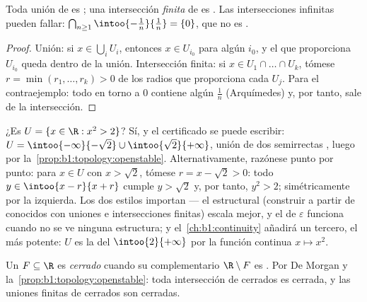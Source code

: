 \begin{proposition}\label{prop:b1:topology:openstable}
Toda unión de  es ; una intersección \emph{finita} de
 es . Las intersecciones infinitas pueden fallar:
$\bigcap_{n \geq 1} \intoo{-\frac 1n}{\frac 1n} = \{0\}$, que no es .
\end{proposition}

\begin{proof}
Unión: si $x \in \bigcup_i U_i$, entonces $x \in U_{i_0}$ para algún
$i_0$, y el  que proporciona $U_{i_0}$ queda dentro de la
unión. Intersección finita: si $x \in U_1 \cap \dots \cap U_k$, tómese
$r = \min(r_1, \dots, r_k) > 0$ de los radios que proporciona cada
$U_j$. Para el contraejemplo: todo  en torno a $0$ contiene
algún $\frac{1}{n}$ (Arquímedes) y, por tanto, sale de la intersección.
\end{proof}

\begin{example}\label{ex:b1:topology:radii}
¿Es  $U = \{x \in \R : x^2 > 2\}$? Sí, y el certificado se
puede escribir: $U = \intoo{-\infty}{-\sqrt2} \cup
\intoo{\sqrt2}{+\infty}$, unión de dos semirrectas , luego
 por la~\cref{prop:b1:topology:openstable}. Alternativamente,
razónese punto por punto: para $x \in U$ con $x > \sqrt 2$, tómese
$r = x - \sqrt2 > 0$: todo $y \in \intoo{x - r}{x + r}$ cumple
$y > \sqrt 2$ y, por tanto, $y^2 > 2$; simétricamente por la
izquierda. Los dos estilos importan --- el estructural (construir a
partir de  conocidos con uniones e intersecciones finitas)
escala mejor, y el de $\varepsilon$ funciona cuando no se ve ninguna
estructura; y el~\cref{ch:b1:continuity} añadirá un tercero, el más
potente: $U$ es la  del 
$\intoo{2}{+\infty}$ por la función continua $x \mapsto x^2$.
\end{example}

\begin{definition}\label{def:b1:topology:closed}
Un  $F \subseteq \R$ es \emph{cerrado}
cuando su complementario $\R \setminus F$ es . Por De Morgan y
la~\cref{prop:b1:topology:openstable}: toda intersección de 
cerrados es cerrada, y las uniones finitas de cerrados son cerradas.
\end{definition}

